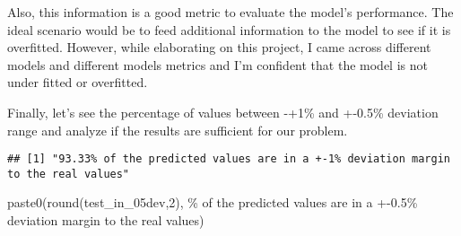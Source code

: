 \documentclass[
]{article}
\newenvironment{Shaded}{\begin{snugshade}}{\end{snugshade}}
\newcommand{\DecValTok}[1]{\textcolor[rgb]{0.00,0.00,0.81}{#1}}
\newcommand{\FloatTok}[1]{\textcolor[rgb]{0.00,0.00,0.81}{#1}}
\newcommand{\FunctionTok}[1]{\textcolor[rgb]{0.00,0.00,0.00}{#1}}
\newcommand{\NormalTok}[1]{#1}
\newcommand{\OtherTok}[1]{\textcolor[rgb]{0.56,0.35,0.01}{#1}}
\newcommand{\SpecialCharTok}[1]{\textcolor[rgb]{0.00,0.00,0.00}{#1}}
\newcommand{\StringTok}[1]{\textcolor[rgb]{0.31,0.60,0.02}{#1}}
\begin{document}
Also, this information is a good metric to evaluate the model's
performance. The ideal scenario would be to feed additional information
to the model to see if it is overfitted. However, while elaborating on
this project, I came across different models and different models
metrics and I'm confident that the model is not under fitted or
overfitted.

Finally, let's see the percentage of values between -+1\% and +-0.5\%
deviation range and analyze if the results are sufficient for our
problem.

\begin{Shaded}
\end{Shaded}

\begin{verbatim}
## [1] "93.33% of the predicted values are in a +-1% deviation margin to the real values"
\end{verbatim}

\begin{Shaded}
\begin{Highlighting}[]
\FunctionTok{paste0}\NormalTok{(}\FunctionTok{round}\NormalTok{(test\_in\_05dev,}\DecValTok{2}\NormalTok{), }\StringTok{\textquotesingle{}\% of the predicted values are in a +{-}0.5\% deviation margin to the real values\textquotesingle{}}\NormalTok{)}
\end{Highlighting}
\end{Shaded}
\end{document}
